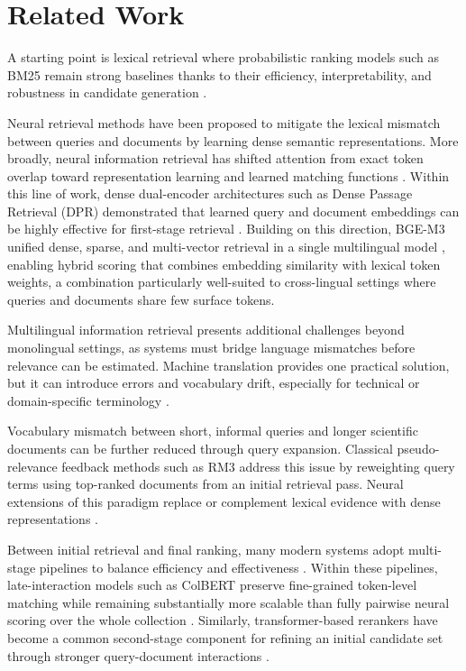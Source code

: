 \section{Related Work}
\label{sec:related}

A starting point is lexical retrieval where probabilistic ranking models such as BM25 remain strong baselines thanks to their efficiency, interpretability, and robustness in candidate generation \citep{RobertsonZaragoza2009}.

Neural retrieval methods have been proposed to mitigate the lexical mismatch between queries and documents by learning dense semantic representations. More broadly, neural information retrieval has shifted attention from exact token overlap toward representation learning and learned matching functions \citep{MarchesinEtAl2020}. Within this line of work, dense dual-encoder architectures such as Dense Passage Retrieval (DPR) demonstrated that learned query and document embeddings can be highly effective for first-stage retrieval \citep{KarpukhinEtAl2020}. Building on this direction, BGE-M3 unified dense, sparse, and multi-vector retrieval in a single multilingual model \citep{bge-m3},
enabling hybrid scoring that combines embedding similarity with lexical token weights, a combination particularly well-suited to cross-lingual settings where queries and documents share few surface tokens.

Multilingual information retrieval presents additional challenges beyond monolingual settings, as systems must bridge language mismatches before relevance can be estimated. Machine translation provides one practical solution, but it can introduce errors and vocabulary drift, especially for technical or domain-specific terminology \citep{SennrichEtAl2016}.

Vocabulary mismatch between short, informal queries and longer scientific documents can be further reduced through query expansion. Classical pseudo-relevance feedback methods such as RM3 \citep{LavrenkoEtAl2001} address this issue by reweighting query terms using top-ranked documents from an initial retrieval pass. Neural extensions of this paradigm replace or complement lexical evidence with dense representations \citep{WangEtAl2021PRF}. 

Between initial retrieval and final ranking, many modern systems adopt multi-stage pipelines to balance efficiency and effectiveness \citep{MarchesinEtAl2020}. Within these pipelines, late-interaction models such as ColBERT preserve fine-grained token-level matching while remaining substantially more scalable than fully pairwise neural scoring over the whole collection \citep{khattab2020colbert}. Similarly, transformer-based rerankers have become a common second-stage component for refining an initial candidate set through stronger query-document interactions \citep{NogueiraEtAl2020}.

